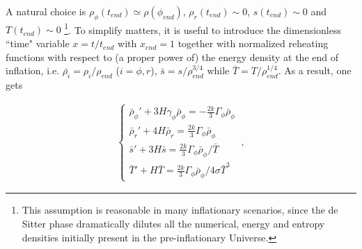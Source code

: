 \documentclass[%
aps,prd,nofootinbib,showkeys,a4paper,10pt
]{revtex4-2}
\begin{document}
A natural choice is 
$\rho_{\phi}(t_{end})\simeq \rho(\phi_{end})$, $\rho_{r}(t_{end})\sim 0$,  $s(t_{end})\sim 0$ and  $T(t_{end})\sim 0$
\footnote{This assumption is reasonable in many inflationary scenarios, 
since the de Sitter phase dramatically dilutes all the numerical, energy and entropy densities initially present in the pre-inflationary Universe.}.
To simplify matters, it is useful to introduce the dimensionless ``time" variable $x=t/t_{end}$ with $x_{end}=1$ together with normalized reheating functions
with respect to (a proper power of) the energy density at the end of inflation, i.e.
$\bar{\rho_i}=\rho_i/\rho_{end}$ ($i=\phi,r$), $\bar{s}=s/\rho_{end}^{3/4}$ while $\bar{T}=T/\rho_{end}^{1/4}$.
As a result, one gets

\begin{eqnarray}\label{eqn:generalsystem_2}
\begin{cases}
\bar{\rho}_{\phi}' + 3H\gamma_{\phi}\bar{\rho}_{\phi}=-\frac{2k}{3}\Gamma_{\phi}\bar{\rho}_{\phi} \\
\bar{\rho}_{r}' + 4H\bar{\rho}_{r}=\frac{2k}{3}\Gamma_{\phi}\bar{\rho}_{\phi}  \\ 
\bar{s}'+3H\bar{s}=\frac{2k}{3}\Gamma_{\phi}\bar{\rho}_{\phi}/\bar{T} \\
\bar{T}'+H\bar{T} = \frac{2k}{3}\Gamma_{\phi}\bar{\rho}_{\phi}/4\sigma \bar{T}^3
\end{cases} \ ,
\end{eqnarray}
\end{document}
